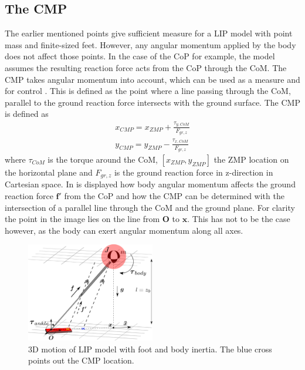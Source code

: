 \subsection{The \ac{CMP}}
The earlier mentioned points give sufficient measure for a \ac{LIP} model with point mass and finite-sized feet. However, any angular momentum applied by the body does not affect those points. In the case of the \ac{CoP} for example, the model assumes the resulting reaction force acts from the \ac{CoP} through the \ac{CoM}. The \ac{CMP} takes angular momentum into account, which can be used as a measure and for control \cite{popovic2005ground}. This is defined as the point where a line passing through the \ac{CoM}, parallel to the ground reaction force intersects with the ground surface. The \ac{CMP} is defined as
\begin{eqnarray}
x_{CMP} = x_{ZMP} + \frac{\tau_{y,CoM}}{F_{gr,z}}\\
y_{CMP} = y_{ZMP} - \frac{\tau_{x,CoM}}{F_{gr,z}}
\end{eqnarray}
where $\tau_{CoM}$ is the torque around the \ac{CoM}, $[x_{ZMP},y_{ZMP}]$ the \ac{ZMP} location on the horizontal plane and $F_{gr,z}$ is the ground reaction force in z-direction in Cartesian space. In  is displayed how body angular momentum affects the ground reaction force $\boldsymbol{f'}$ from the \ac{CoP} and how the \ac{CMP} can be determined with the intersection of a parallel line through the \ac{CoM} and the ground plane. For clarity the point in the image lies on the line from $\boldsymbol{O}$ to $\boldsymbol{x}$. This has not to be the case however, as the body can exert angular momentum along all axes. 
\begin{figure}[h]
\centering
\includegraphics[width=0.5\textwidth]{STYLESTUFF/3DCoMwithfootinertia.png}
\caption{\ac{3D} motion of \ac{LIP} model with foot and body inertia. The blue cross points out the \ac{CMP} location.}
\label{fig:3dlipfootinertia}
\end{figure}

